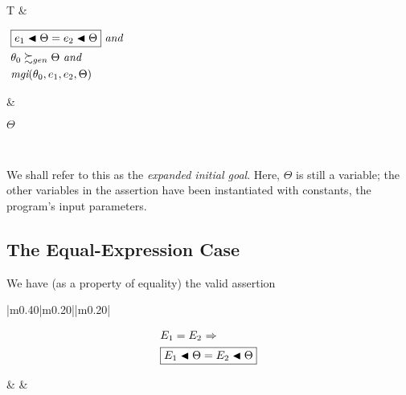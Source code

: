 \documentclass[runningheads]{llncs}
\DeclareMathOperator{\uand}{\emph{and}\,}
\DeclareMathOperator{\uimplies}{\Rightarrow}
\DeclareMathOperator{\mgi}{\emph{mgi}}
\begin{document}
    \begin{center}
  \begin{tabular}%
  {T}
\hline
 & \begin{center}
${\begin{aligned} 
&\begin{aligned}
&\boxed{\e{1} \apply \Theta = \e{2} \apply \Theta} \, \uand 
 \\
 \,\, & \thet{0} \moregen \Theta \, \uand
\\
  \,\, & {\mgi}(\thet{0}, \e{1}, \e{2}, \Theta)
\end{aligned}\end{aligned}}$\hspace{1cm} 
\end{center} & \begin{center}$\Theta$\end{center} \\  \hline
\end{tabular}
\end{center}


We shall refer to this as the \emph{expanded initial goal}. Here, $\Theta$ is still a variable; the other variables in the assertion have been instantiated with constants, the program's input parameters.

\subsection{The Equal-Expression Case}\label{sec:eq-exps}

We have (as a property of equality) the valid assertion
\begin{center}
  \begin{tabular}%
  {|m{0.40\textwidth}|m{0.20\textwidth}||m{0.20\textwidth}|}
\hline
\begin{center}
\hspace{-.5cm}
{\begin{align*}
&  \E{1} = \E{2}  \, \uimplies \\
& \boxed{\E{1}\apply\Theta = \E{2}\apply\Theta}
\end{align*}}
\end{center}
 & &
\\
\hline
\end{tabular}
\end{center}
\end{document}
